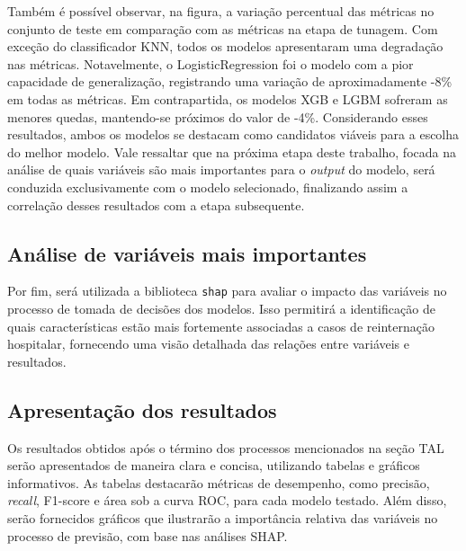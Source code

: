 Também é possível observar, na figura, a variação percentual das métricas no conjunto de teste em comparação com as métricas na etapa de tunagem. Com exceção do classificador KNN, todos os modelos apresentaram uma degradação nas métricas. Notavelmente, o LogisticRegression foi o modelo com a pior capacidade de generalização, registrando uma variação de aproximadamente -8\% em todas as métricas. Em contrapartida, os modelos XGB e LGBM sofreram as menores quedas, mantendo-se próximos do valor de -4\%. Considerando esses resultados, ambos os modelos se destacam como candidatos viáveis para a escolha do melhor modelo. Vale ressaltar que na próxima etapa deste trabalho, focada na análise de quais variáveis são mais importantes para o \textit{output} do modelo, será conduzida exclusivamente com o modelo selecionado, finalizando assim a correlação desses resultados com a etapa subsequente.

\subsection{Análise de variáveis mais importantes}
Por fim, será utilizada a biblioteca \texttt{shap} para avaliar o impacto das variáveis no processo de tomada de decisões dos modelos. Isso permitirá a identificação de quais características estão mais fortemente associadas a casos de reinternação hospitalar, fornecendo uma visão detalhada das relações entre variáveis e resultados.

\subsection{Apresentação dos resultados}
Os resultados obtidos após o término dos processos mencionados na seção TAL serão apresentados de maneira clara e concisa, utilizando tabelas e gráficos informativos. As tabelas destacarão métricas de desempenho, como precisão, \textit{recall}, F1-score e área sob a curva ROC, para cada modelo testado. Além disso, serão fornecidos gráficos que ilustrarão a importância relativa das variáveis no processo de previsão, com base nas análises SHAP.

